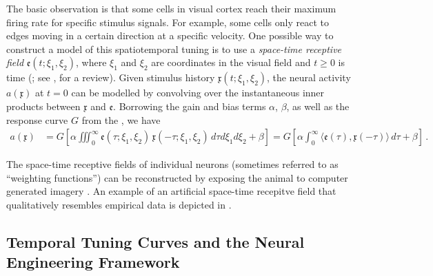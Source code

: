 The basic observation is that some cells in visual cortex reach their maximum firing rate for specific stimulus signals.
For example, some cells only react to edges moving in a certain direction at a specific velocity.
One possible way to construct a model of this spatiotemporal tuning is to use a \emph{space-time receptive field} $\mathfrak{e}(t; \xi_1, \xi_2)$, where $\xi_1$ and $\xi_2$ are coordinates in the visual field and $t \geq 0$ is time (\cite{watson1983look,adelson1985spatiotemporal}; see \cite{carandini1999linearity}, for a review).
Given stimulus history $\mathfrak{x}(t; \xi_1, \xi_2)$, the neural activity $a(\mathfrak{x})$ at $t = 0$ can be modelled by convolving over the instantaneous inner products between $\mathfrak{x}$ and $\mathfrak{e}$.
Borrowing the gain and bias terms $\alpha$, $\beta$, as well as the response curve $G$ from the \NEF, we have
\begin{align}
	a(\mathfrak{x})
		&= G\left[\alpha \! \iiint_0^\infty \!\!\! \mathfrak{e}(\tau; \xi_1, \xi_2) \, \mathfrak{x}(-\tau; \xi_1, \xi_2) \,
		\mathit{d \tau} \mathit{d \xi_1} \mathit{d \xi_2} + \beta \right]
		 = G\left[\alpha \! \int_0^\infty \!\!\! \big\langle \mathfrak{e}(\tau), \mathfrak{x}(-\tau) \big\rangle \,
		 \mathit{d \tau} + \beta \right] \, .
	\label{eqn:tuning_curve_from_temporal_receptive_field}
\end{align}

The space-time receptive fields of individual neurons (sometimes referred to as \enquote{weighting functions}) can be reconstructed by exposing the animal to computer generated imagery \citep{mclean1989contribution}.
An example of an artificial space-time recepitve field that qualitatively resembles empirical data \citep[cf.][]{deangelis1993spatiotemporal} is depicted in .

\subsection{Temporal Tuning Curves and the Neural Engineering Framework}
\label{sec:temporal_tuning_nef}

